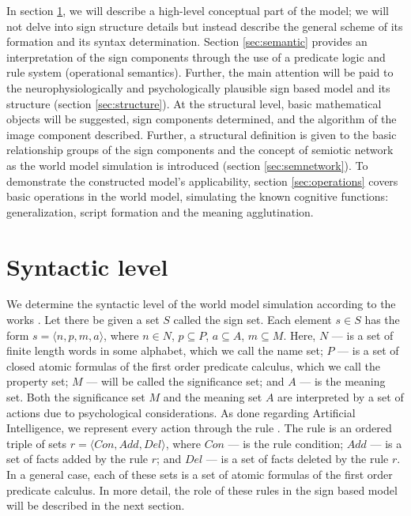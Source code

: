\documentclass[review]{elsarticle}
\begin{document}
In section \ref{sec:sintaxis}, we will describe a high-level conceptual part of the model; we will not delve into sign structure details but instead describe the general scheme of its formation and its syntax determination. Section \ref{sec:semantic} provides an interpretation of the sign components through the use of a predicate logic and rule system (operational semantics). Further, the main attention will be paid to the neurophysiologically and psychologically plausible sign based model and its structure (section \ref{sec:structure}). At the structural level, basic mathematical objects will be suggested, sign components determined, and the algorithm of the image component described. Further, a structural definition is given to the basic relationship groups of the sign components and the concept of semiotic network as the world model simulation is introduced (section \ref{sec:semnetwork}). To demonstrate the constructed model’s applicability, section \ref{sec:operations} covers basic operations in the world model, simulating the known cognitive functions: generalization, script formation and the meaning agglutination.

\section{Syntactic level}\label{sec:sintaxis}

We determine the syntactic level of the world model simulation according to the works \cite{Osipov2014c,Osipov2015c}. Let there be given a set $S$ called the sign set. Each element $s\in S$ has the form $s=\langle n,p,m,a\rangle$, where $n\in N$, $p\subseteq P$, $a\subseteq A$, $m\subseteq M$. Here, $N$ --- is a set of finite length words in some alphabet, which we call the name set; $P$ --- is a set of closed atomic formulas of the first order predicate calculus, which we call the property set; $M$ --- will be called the significance set; and $A$ --- is the meaning set. Both the significance set $M$ and the meaning set $A$ are interpreted by a set of actions due to psychological considerations. As done regarding Artificial Intelligence, we represent every action through the rule \cite{Osipov2002b}. The rule is an ordered triple of sets $r=\langle Con,Add,Del\rangle$, where $Con$ --- is the rule condition; $Add$ --- is a set of facts added by the rule $r$; and $Del$ --- is a set of facts deleted by the rule $r$. In a general case, each of these sets is a set of atomic formulas of the first order predicate calculus. In more detail, the role of these rules in the sign based model will be described in the next section.
\end{document}
